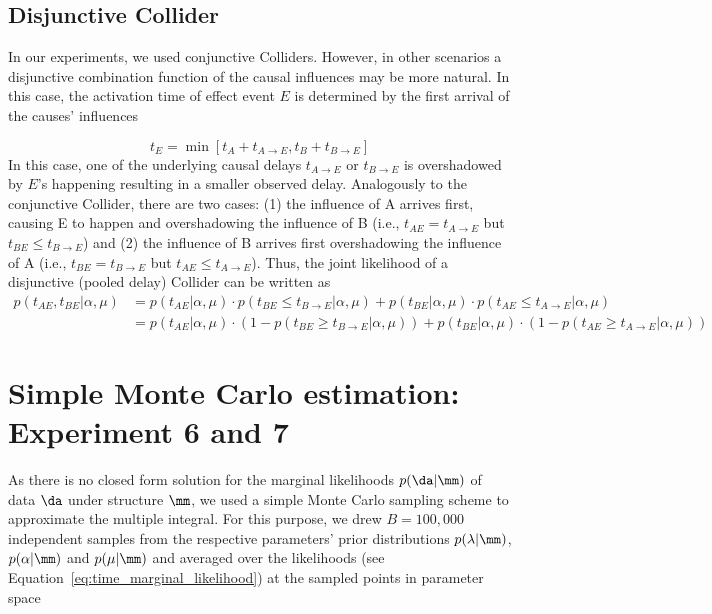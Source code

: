 \subsection*{Disjunctive Collider}

In our experiments, we used conjunctive Colliders. However, in other scenarios a disjunctive combination function of the causal influences may be more natural. In this case, the activation time of effect event $E$ is determined by the first arrival of the causes' influences

\begin{equation}
t_E = \min [t_A + t_{A\rightarrow E}, t_B + t_{B\rightarrow E}]
\end{equation}
In this case, one of the underlying causal delays $t_{A\rightarrow E}$ or $t_{B\rightarrow E}$ is overshadowed by $E$'s happening resulting in a smaller observed delay. Analogously to the conjunctive Collider, there are two cases: (1) the influence of A arrives first, causing E to happen and overshadowing the influence of B (i.e., $t_{AE} = t_{A\rightarrow E}$ but $t_{BE} \leq t_{B\rightarrow E}$) and (2) the influence of B arrives first overshadowing the influence of A (i.e., $t_{BE} = t_{B\rightarrow E}$ but $t_{AE} \leq t_{A\rightarrow E}$). Thus, the joint likelihood of a disjunctive (pooled delay) Collider can be written as
\begin{align}
p(t_{AE}, t_{BE}|\alpha,\mu) &= p(t_{AE}|\alpha,\mu)\cdot p(t_{BE}\leq t_{B\rightarrow E}|\alpha,\mu) + p(t_{BE}|\alpha,\mu)\cdot p(t_{AE}\leq t_{A\rightarrow E}|\alpha,\mu) \\
&= p(t_{AE}|\alpha,\mu)\cdot (1-p(t_{BE}\geq t_{B\rightarrow E}|\alpha,\mu)) + p(t_{BE}|\alpha,\mu)\cdot (1-p(t_{AE}\geq t_{A\rightarrow E}|\alpha,\mu))
\label{eq:time_collider_pooled_disjunctive}
\end{align}

\section{Simple Monte Carlo estimation: Experiment 6 and 7}

As there is no closed form solution for the marginal likelihoods $p(\da|\mm)$ of data $\da$ under structure $\mm$, we used a simple Monte Carlo sampling scheme to approximate the multiple integral. For this purpose, we drew $B=100,000$ independent samples from the respective parameters' prior distributions $p(\lambda|\mm)$, $p(\alpha|\mm)$ and $p(\mu|\mm)$ and averaged over the likelihoods (see Equation~\ref{eq:time_marginal_likelihood}) at the sampled points in parameter space

